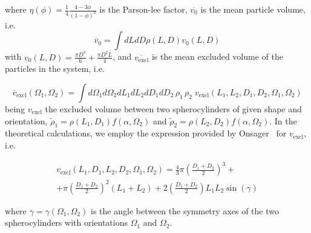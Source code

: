 \documentclass[journal=jacsat,manuscript=article]{achemso}
\begin{document}
where $\eta(\phi) = \frac{1}{4} \frac{4 - 3\phi}{(1 - \phi)^2}$ is the Parson-lee factor, 
$\overline{v_0}$ is the mean particle volume, i.e.
\begin{equation}
\overline{v}_0 = \int dL dD \rho(L,D) v_0(L, D)
\end{equation}
with $v_0(L, D) = \frac{\pi D^3}{6} + \frac{\pi D^2 L}{4}$, 
and 
$\overline{v_\mathrm{excl}}$ is the mean excluded volume of the particles in the system, i.e.

\begin{equation}
\overline{v}_\mathrm{excl}(\Omega_1, \Omega_2) = \int d\Omega_1 d\Omega_2 dL_1 dL_2 dD_1 dD_2\, \rho_1\, \rho_2\; v_\mathrm{excl}(L_1, L_2, D_1, D_2, \Omega_1, \Omega_2) 
 \end{equation}
being $v_\mathrm{excl}$ the excluded volume between two spherocylinders of given shape and orientation, $\tilde\rho_1=\rho(L_1,D_1) f(\alpha,\Omega_2)$ and
$\tilde\rho_2=\rho(L_2, D_2) f(\alpha,\Omega_2)$.
In the theoretical calculations, we employ the expression provided by Onsager~\cite{onsager1949effects} for $v_\mathrm{excl}$, i.e.

\begin{multline} \label{eq:vexcl}
	v_\mathrm{excl}(L_1, D_1, L_2, D_2, \Omega_1, \Omega_2) = \frac{4}{3} \pi \left(\frac{D_1 + D_2}{2}\right)^3 + \\ + \pi \left(\frac{D_1 + D_2}{2}\right)^2 (L_1 + L_2) + 2 \left( \frac{D_1 + D_2}{2} \right) L_1 L_2 \sin(\gamma)
\end{multline}

where $\gamma=\gamma(\Omega_1,\Omega_2)$ is the angle between the symmetry axes of the two spherocylinders with orientations $\Omega_1$ and $\Omega_2$.

	
	
\end{document}
